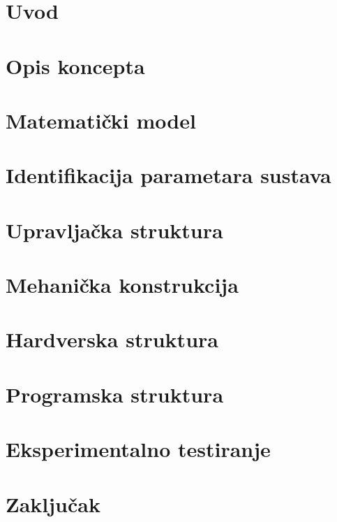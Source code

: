 \documentclass[11pt,a4paper]{article}
\begin{document}
\section{Uvod}


\newpage
\section{Opis koncepta} 


\newpage
\section{Matematički model}


\newpage
\section{Identifikacija parametara sustava}


\newpage
\section{Upravljačka struktura}


\newpage
\section{Mehanička konstrukcija}


\newpage
\section{Hardverska struktura}


\newpage
\section{Programska struktura}


\newpage
\section{Eksperimentalno testiranje}



\newpage
\section{Zaključak} 

\end{document}
